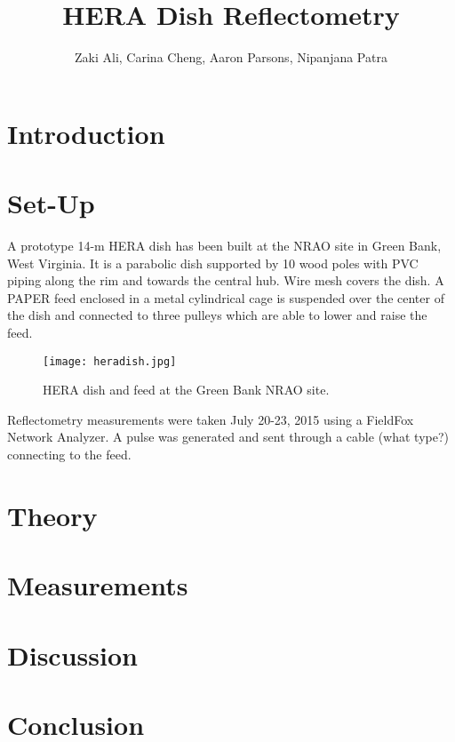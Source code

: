 \documentclass[12pt,preprint]{aastex}
\begin{document}
\title{HERA Dish Reflectometry} 
\author{Zaki Ali, Carina Cheng, Aaron Parsons, Nipanjana Patra}
\maketitle

\section{Introduction}

\section{Set-Up}

A prototype 14-m HERA dish has been built at the NRAO site in Green Bank, West Virginia. It is a parabolic dish supported by 10 wood poles with PVC piping along the rim and towards the central hub. Wire mesh covers the dish. A PAPER feed enclosed in a metal cylindrical cage is suspended over the center of the dish and connected to three pulleys which are able to lower and raise the feed. 

\begin{figure}[H]
\centering
\texttt{[image: heradish.jpg]}
\caption{HERA dish and feed at the Green Bank NRAO site.}
\end{figure}

Reflectometry measurements were taken July 20-23, 2015 using a FieldFox Network Analyzer. A pulse was generated and sent through a cable (what type?) connecting to the feed. 

\section{Theory}

\section{Measurements}

\section{Discussion}

\section{Conclusion}
\end{document}

